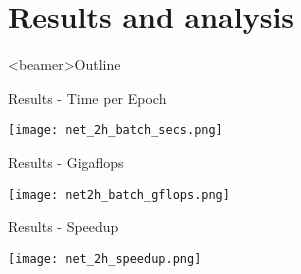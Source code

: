 \section{Results and analysis}

\begin{frame}<beamer>{Outline}
\end{frame}

\begin{frame}{Results - Time per Epoch}

		\begin{center}
		\texttt{[image: net\_2h\_batch\_secs.png]}
		\end{center}

\end{frame}
 
\begin{frame}{Results - Gigaflops}
     
		\begin{center}
		\texttt{[image: net2h\_batch\_gflops.png]}
		\end{center}

 \end{frame} 

\begin{frame}{Results - Speedup}
     
		\begin{center}
		\texttt{[image: net\_2h\_speedup.png]}
		\end{center}

\end{frame}


